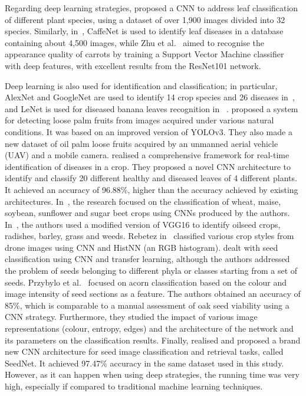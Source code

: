 \documentclass[twocolumn]{svjour3}           %
\begin{document}
Regarding deep learning strategies, \cite{Hall2015} proposed a CNN to address leaf classification of different plant species, using a dataset of over 1,900 images divided into 32 species. Similarly, in~\cite{Slado2016}, CaffeNet is used to identify leaf diseases in a database containing about 4,500 images, while Zhu et al.~\cite{Zhu2021} aimed to recognise the appearance quality of carrots by training a Support Vector Machine classifier with deep features, with excellent results from the ResNet101 network.

Deep learning is also used for identification and classification; in particular, AlexNet and GoogleNet are used to identify 14 crop species and 26 diseases in~\cite{Moha2016}, and LeNet is used for diseased banana leaves recognition in ~\cite{Amara2017}. \cite{Junos2021} proposed a system for detecting loose palm fruits from images acquired under various natural conditions. It was based on an improved version of YOLOv3. They also made a new dataset of oil palm loose fruits acquired by an unmanned aerial vehicle (UAV) and a mobile camera. \cite{Gajjar2021} realised a comprehensive framework for real-time identification of diseases in a crop. They proposed a novel CNN architecture to identify and classify 20 different healthy and diseased leaves of 4 different plants. It achieved an accuracy of 96.88\%, higher than the accuracy achieved by existing architectures.
In~\cite{Kussul2017}, the research focused on the classification of wheat, maise, soybean, sunflower and sugar beet crops using CNNs produced by the authors. In~\cite{Mort2016}, the authors used a modified version of VGG16 to identify oilseed crops, radishes, barley, grass and weeds. Rebetez in~\cite{Rebe2016} classified various crop styles from drone images using CNN and HistNN (an RGB histogram). 
\cite{Gulzar2020} dealt with seed classification using CNN and transfer learning, although the authors addressed the problem of seeds belonging to different phyla or classes starting from a set of seeds. Przybylo et al.~\cite{Przybylo19} focused on acorn classification based on the colour and image intensity of seed sections as a feature. The authors obtained an accuracy of 85\%, which is comparable to a manual assessment of oak seed viability using a CNN strategy. Furthermore, they studied the impact of various image representations (colour, entropy, edges) and the architecture of the network and its parameters on the classification results. Finally, \cite{Loddo2021} realised and proposed a brand new CNN architecture for seed image classification and retrieval tasks, called SeedNet. It achieved 97.47\% accuracy in the same dataset used in this study. However, as it can happen when using deep strategies, the running time was very high, especially if compared to traditional machine learning techniques. 
\end{document}
